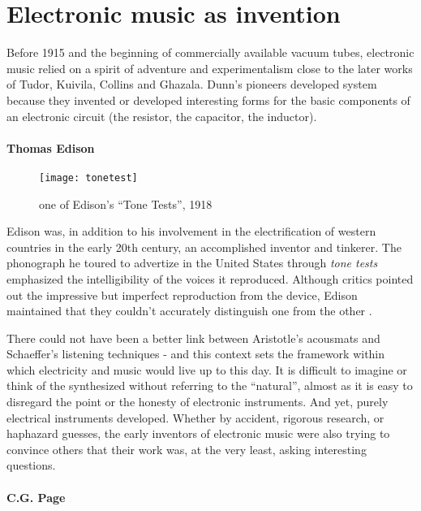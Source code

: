 \section{Electronic music as invention}

	Before 1915 and the beginning of commercially available vacuum tubes, electronic music relied on a spirit of adventure and experimentalism close to the later works of Tudor, Kuivila, Collins and Ghazala. Dunn's pioneers developed system because they invented or developed interesting forms for the basic components of an electronic circuit (the resistor, the capacitor, the inductor). 
	
\paragraph{Thomas Edison}

	\begin{figure}[h!]
	  \caption{one of Edison's ``Tone Tests'', 1918 \cite{thompson1995}}
	  \centering
	    \texttt{[image: tonetest]}
	\end{figure}
	
Edison was, in addition to his involvement in the electrification of western countries in the early 20th century, an accomplished inventor and tinkerer. The phonograph he toured to advertize in the United States through \emph{tone tests} emphasized the intelligibility of the voices it reproduced. Although critics pointed out the impressive but imperfect reproduction from the device, Edison maintained that they couldn't accurately distinguish one from the other \cite{thompson1995}. 

There could not have been a better link between Aristotle's acousmats and Schaeffer's listening techniques - and this context sets the framework within which electricity and music would live up to this day. It is difficult to imagine or think of the synthesized without referring to the ``natural'', almost as it is easy to disregard the point or the honesty of electronic instruments. And yet, purely electrical instruments developed. Whether by accident, rigorous research, or haphazard guesses, the early inventors of electronic music were also trying to convince others that their work was, at the very least, asking interesting questions. 
	
\paragraph{C.G. Page}

